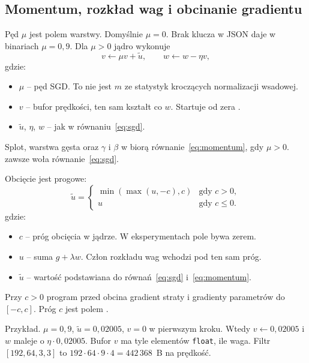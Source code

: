 \subsection{Momentum, rozkład wag i obcinanie gradientu}

Pęd \(\mu\) jest polem warstwy. Domyślnie \(\mu = 0\). Brak klucza w JSON daje w binariach \(\mu = 0{,}9\). Dla \(\mu > 0\) jądro  wykonuje
\begin{equation}
\label{eq:momentum}
v \leftarrow \mu v + \widetilde{u},
\qquad
w \leftarrow w - \eta v,
\end{equation}
gdzie:
\begin{itemize}
\item \(\mu\) -- pęd SGD. To nie jest \(m\) ze statystyk kroczących normalizacji wsadowej.
\item \(v\) -- bufor prędkości, ten sam kształt co \(w\). Startuje od zera \cite{goodfellow2016deep}.
\item \(\widetilde{u}\), \(\eta\), \(w\) -- jak w równaniu~\eqref{eq:sgd}.
\end{itemize}

Splot, warstwa gęsta oraz \(\gamma\) i \(\beta\) w  biorą równanie~\eqref{eq:momentum}, gdy \(\mu > 0\).  zawsze woła równanie~\eqref{eq:sgd}.

Obcięcie jest progowe:
\begin{equation}
\label{eq:clip}
\widetilde{u} =
\begin{cases}
\min(\max(u, -c), c) & \text{gdy } c > 0,\\
u & \text{gdy } c \le 0.
\end{cases}
\end{equation}
gdzie:
\begin{itemize}
\item \(c\) -- próg obcięcia w jądrze. W eksperymentach pole bywa zerem.
\item \(u\) -- suma \(g + \lambda w\). Człon rozkładu wag wchodzi pod ten sam próg.
\item \(\widetilde{u}\) -- wartość podstawiana do równań~\eqref{eq:sgd} i~\eqref{eq:momentum}.
\end{itemize}

Przy \(c > 0\) program przed  obcina gradient straty i gradienty parametrów do \([-c, c]\). Próg \(c\) jest polem .

Przykład. \(\mu = 0{,}9\), \(\widetilde{u} = 0{,}02005\), \(v = 0\) w pierwszym kroku. Wtedy \(v \leftarrow 0{,}02005\) i \(w\) maleje o \(\eta \cdot 0{,}02005\). Bufor \(v\) ma tyle elementów \texttt{float}, ile waga. Filtr \([192, 64, 3, 3]\) to \(192 \cdot 64 \cdot 9 \cdot 4 = 442\,368\)~B na prędkość.

